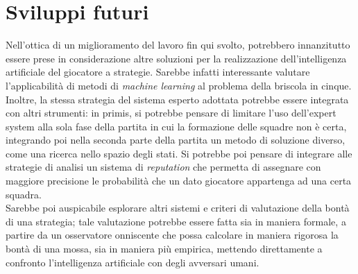 \section{Sviluppi futuri}

Nell'ottica di un miglioramento del lavoro fin qui svolto, potrebbero innanzitutto essere prese in considerazione altre soluzioni per la realizzazione dell'intelligenza artificiale del giocatore a strategie. Sarebbe infatti interessante valutare l'applicabilità di metodi di \emph{machine learning} al problema della briscola in cinque. Inoltre, la stessa strategia del sistema esperto adottata potrebbe essere integrata con altri strumenti: in primis, si potrebbe pensare di limitare l'uso dell'expert system alla sola fase della partita in cui la formazione delle squadre non è certa, integrando poi nella seconda parte della partita un metodo di soluzione diverso, come una ricerca nello spazio degli stati. Si potrebbe poi pensare di integrare alle strategie di analisi un sistema di \emph{reputation} che permetta di assegnare con maggiore precisione le probabilità che un dato giocatore appartenga ad una certa squadra.\\
Sarebbe poi auspicabile esplorare altri sistemi e criteri di valutazione della bontà di una strategia; tale valutazione potrebbe essere fatta sia in maniera formale, a partire da un osservatore onniscente che possa calcolare in maniera rigorosa la bontà di una mossa, sia in maniera più empirica, mettendo direttamente a confronto l'intelligenza artificiale con degli avversari umani.\\





